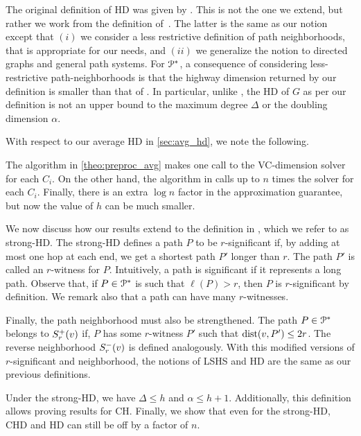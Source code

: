 The original definition of HD was given by \citep{highway2010}. This is not the one we extend, but rather we work from the definition of~\citep{highway2013}.
The latter is the same as our notion except that $(i)$ we consider a less restrictive definition of path neighborhoods, that is appropriate for our needs, and $(ii)$ we generalize the notion to directed graphs and general path systems.
For $\mathcal{P}^*$, a consequence of considering less-restrictive path-neighborhoods is that the highway dimension returned by our definition is smaller than that of \citep{highway2013}.
In particular, unlike \citep{highway2013}, the HD of $G$ as per our definition is not an upper bound to the maximum degree $\Delta$ or the doubling dimension $\alpha$.

With respect to our average HD in \cref{sec:avg_hd}, we note the following.
\begin{remark}
The algorithm in \cref{theo:preproc_avg} makes one call to the VC-dimension solver for each $C_i$.
On the other hand, the algorithm in \citep{highway2013} calls up to $n$ times the solver for each $C_i$.
Finally, there is an extra $\log n$ factor in the approximation guarantee, but now the value of $h$ can be much smaller.
\end{remark}

We now discuss how our results extend to the definition in \citep{highway2013}, which we refer to as strong-HD.
The strong-HD defines a path $P$ to be $r$-significant if, by adding at most one hop at each end, we get a shortest path $P'$ longer than $r$.
The path $P'$ is called an $r$-witness for $P$.
Intuitively, a path is significant if it represents a long path.
Observe that, if $P\in\mathcal{P}^*$ is such that $\ell(P)>r$, then $P$ is $r$-significant by definition.
We remark also that a path can have many $r$-witnesses.

Finally, the path neighborhood must also be strengthened.
The path $P\in\mathcal{P}^*$ belongs to $S^+_r(v)$ if, $P$ has some $r$-witness $P'$ such that $\mbox{dist}(v,P')\leq 2r$.
The reverse neighborhood $S^-_r(v)$ is defined analogously.
With this modified versions of $r$-significant and neighborhood, the notions of LSHS and HD are the same as our previous definitions.

Under the strong-HD, we have  $\Delta\leq h$ and $\alpha\leq h+1$.
Additionally, this definition allows proving results for CH.
Finally, we show that even for the strong-HD, CHD and HD can still be off by a factor of $n$.

